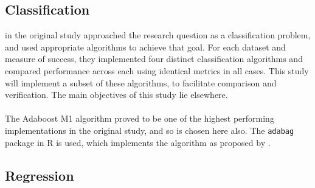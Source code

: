 {\subsection{Classification}
{\cite{moldovan2015learning} in the original study approached the research question as a classification problem, and used appropriate algorithms to achieve that goal. For each dataset and measure of success, they implemented four distinct classification algorithms and compared performance across each using identical metrics in all cases. This study will implement a subset of these algorithms, to facilitate comparison and verification. The main objectives of this study lie elsewhere. \\\\
The Adaboost M1 algorithm proved to be one of the highest performing implementations in the original study, and so is chosen here also. The \texttt{adabag} package in R is used, which implements the algorithm as proposed by \cite{freundAdaboost}. 


}
\subsection{Regression}
}

